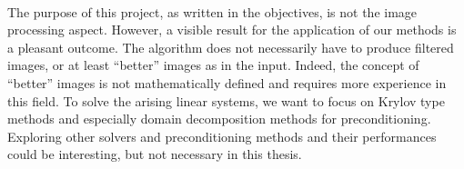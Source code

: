 \paragraph{}
The purpose of this project, as written in the objectives, is not the image processing aspect.
However, a visible result for the application of our methods is a pleasant outcome.
The algorithm does not necessarily have to produce filtered images, or at least ``better'' images as in the input.
Indeed, the concept of ``better'' images is not mathematically defined and requires more experience in this field.
To solve the arising linear systems, we want to focus on Krylov type methods and especially domain decomposition methods for preconditioning.
Exploring other solvers and preconditioning methods and their performances could be interesting, but not necessary in this thesis.
